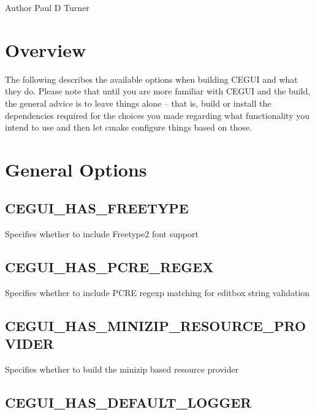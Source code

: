 \begin{DoxyAuthor}{Author}
Paul D Turner
\end{DoxyAuthor}
\hypertarget{build_options_build_options_overview}{}\section{Overview}\label{build_options_build_options_overview}
The following describes the available options when building C\+E\+G\+UI and what they do. Please note that until you are more familiar with C\+E\+G\+UI and the build, the general advice is to leave things alone – that is, build or install the dependencies required for the choices you made regarding what functionality you intend to use and then let cmake configure things based on those.\hypertarget{build_options_build_options_general}{}\section{General Options}\label{build_options_build_options_general}
\hypertarget{build_options_build_options_has_freetype}{}\subsection{C\+E\+G\+U\+I\+\_\+\+H\+A\+S\+\_\+\+F\+R\+E\+E\+T\+Y\+PE}\label{build_options_build_options_has_freetype}
Specifies whether to include Freetype2 font support \hypertarget{build_options_build_options_has_pcre}{}\subsection{C\+E\+G\+U\+I\+\_\+\+H\+A\+S\+\_\+\+P\+C\+R\+E\+\_\+\+R\+E\+G\+EX}\label{build_options_build_options_has_pcre}
Specifies whether to include P\+C\+RE regexp matching for editbox string validation \hypertarget{build_options_build_options_has_minizip}{}\subsection{C\+E\+G\+U\+I\+\_\+\+H\+A\+S\+\_\+\+M\+I\+N\+I\+Z\+I\+P\+\_\+\+R\+E\+S\+O\+U\+R\+C\+E\+\_\+\+P\+R\+O\+V\+I\+D\+ER}\label{build_options_build_options_has_minizip}
Specifies whether to build the minizip based resource provider \hypertarget{build_options_build_options_has_logger}{}\subsection{C\+E\+G\+U\+I\+\_\+\+H\+A\+S\+\_\+\+D\+E\+F\+A\+U\+L\+T\+\_\+\+L\+O\+G\+G\+ER}\label{build_options_build_options_has_logger}

